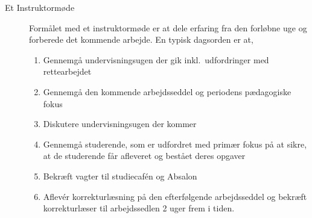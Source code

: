 \documentclass[a4paper]{article}
\begin{document}
\begin{description}
\item[Et Instruktormøde] Formålet med et instruktormøde er at dele
  erfaring fra den forløbne uge og forberede det kommende
  arbejde. En typisk dagsorden er at,
  \begin{enumerate}
  \item Gennemgå undervisningsugen der gik inkl.\ udfordringer med rettearbejdet
  \item Gennemgå den kommende arbejdsseddel og periodens pædagogiske
    fokus
  \item Diskutere undervisningsugen der kommer
  \item Gennemgå studerende, som er udfordret med primær fokus på at
    sikre, at de studerende får afleveret og bestået deres opgaver
  \item Bekræft vagter til studiecaf{\'e}n og Absalon
  \item Aflev{\'e}r korrekturlæsning på den efterfølgende
    arbejdsseddel og bekræft korrekturlæser til arbejdssedlen 2 uger
    frem i tiden.
  \end{enumerate}
\end{description}
\end{document}
